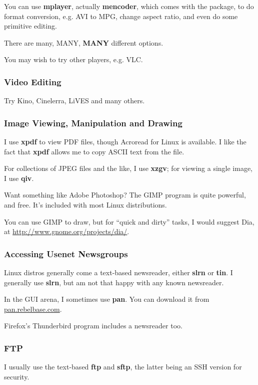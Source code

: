 \documentclass[11pt]{article}
\begin{document}
You can use {\bf mplayer}, actually {\bf mencoder}, which comes with the
package, to do format conversion, e.g. AVI to MPG, change aspect ratio, 
and even do some primitive editing.

There are many, MANY, {\Large \bf MANY} different options.

You may wish to try other players, e.g. VLC.

\subsubsection{Video Editing}

Try Kino, Cinelerra, LiVES and many others.

\subsubsection{Image Viewing, Manipulation and Drawing}

I use {\bf xpdf} to view PDF files, though Acroread for Linux is
available.  I like the fact that {\bf xpdf} allows me to copy ASCII text
from the file.

For collections of JPEG files and the like, I use {\bf xzgv}; for
viewing a single image, I use {\bf qiv}.

Want something like Adobe Photoshop?  The GIMP program is quite
powerful, and free.  It's included with most Linux distributions.

You can use GIMP to draw, but for ``quick and dirty'' tasks, I would
suggest Dia, at \url{http://www.gnome.org/projects/dia/}.

\subsubsection{Accessing Usenet Newsgroups}

Linux distros generally come a text-based newsreader, either {\bf slrn}
or {\bf tin}.  I generally use {\bf slrn}, but am not that happy with
any known newsreader.

In the GUI arena, I sometimes use {\bf pan}.  You can download it from
\url{pan.rebelbase.com}.  

Firefox's Thunderbird program includes a newsreader too.

\subsubsection{FTP}

I usually use the text-based {\bf ftp} and {\bf sftp}, the latter being
an SSH version for security.  
\end{document}
